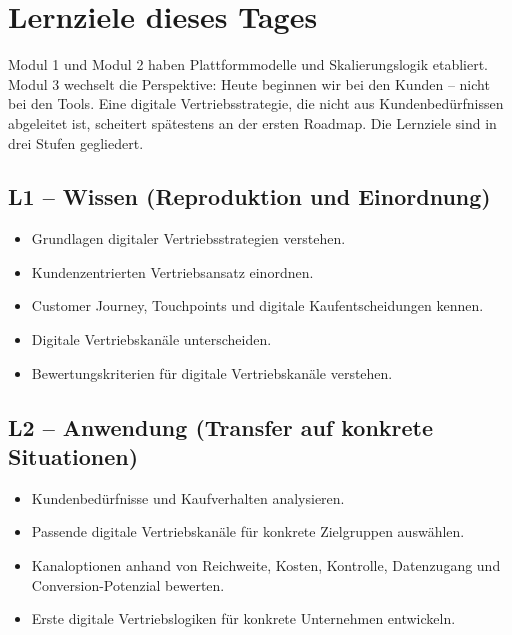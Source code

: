 \documentclass[11pt,a4paper,oneside]{article}
\begin{document}
\section*{Lernziele dieses Tages}
\thispagestyle{plain}

\noindent Modul 1 und Modul 2 haben Plattformmodelle und Skalierungslogik etabliert. Modul 3 wechselt die Perspektive: Heute beginnen wir bei den Kunden -- nicht bei den Tools. Eine digitale Vertriebsstrategie, die nicht aus Kundenbedürfnissen abgeleitet ist, scheitert spätestens an der ersten Roadmap. Die Lernziele sind in drei Stufen gegliedert.

\subsection*{L1 -- Wissen (Reproduktion und Einordnung)}
\begin{itemize}
  \item Grundlagen digitaler Vertriebsstrategien verstehen.
  \item Kundenzentrierten Vertriebsansatz einordnen.
  \item Customer Journey, Touchpoints und digitale Kaufentscheidungen kennen.
  \item Digitale Vertriebskanäle unterscheiden.
  \item Bewertungskriterien für digitale Vertriebskanäle verstehen.
\end{itemize}

\subsection*{L2 -- Anwendung (Transfer auf konkrete Situationen)}
\begin{itemize}
  \item Kundenbedürfnisse und Kaufverhalten analysieren.
  \item Passende digitale Vertriebskanäle für konkrete Zielgruppen auswählen.
  \item Kanaloptionen anhand von Reichweite, Kosten, Kontrolle, Datenzugang und Conversion-Potenzial bewerten.
  \item Erste digitale Vertriebslogiken für konkrete Unternehmen entwickeln.
\end{itemize}
\end{document}
